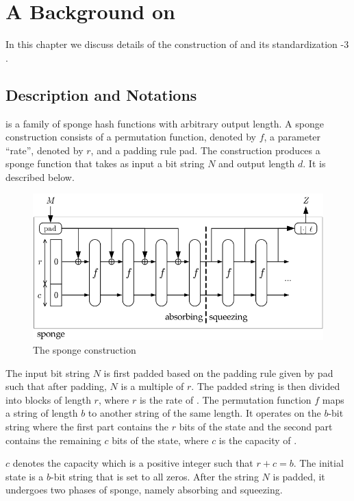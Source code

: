\chapter{A Background on \KECCAK{}}
\label{chap:design-impl}

In this chapter we discuss details of the construction of \KECCAK{} and its standardization \SHA-$3$.

\section{\Keccak{} Description and Notations}
\Keccak{} is a family of sponge hash functions with arbitrary output length. A sponge construction consists of a permutation function, denoted by $f$, a parameter ``rate'', denoted by $r$, and a padding rule pad. The construction produces a sponge function that takes as input a bit string $N$ and output length $d$. 
It is described below.

\begin{figure}
\includegraphics[width=\textwidth]{sponge.png}
\caption{The sponge construction~\cite{bertoni2011cryptographic}\label{sponge}}
\end{figure}

The input bit string $N$ is first padded based on the padding rule given by pad such that after padding, $N$ is a multiple of $r$. The padded string is then divided into blocks of length $r$, where $r$ is the rate of \KECCAK{}. The permutation function $f$ maps a string of length $b$ to another string of the same length. It operates on the $b$-bit string where the first part contains the $r$ bits of the state and the second part contains the remaining $c$ bits of the state, where $c$ is the capacity of \KECCAK{}. 

$c$ denotes the capacity which is a positive integer such that $r + c = b$. The initial state is a $b$-bit string that is set to all zeros. After the string $N$ is padded, it undergoes two phases of sponge, namely absorbing and squeezing. 

